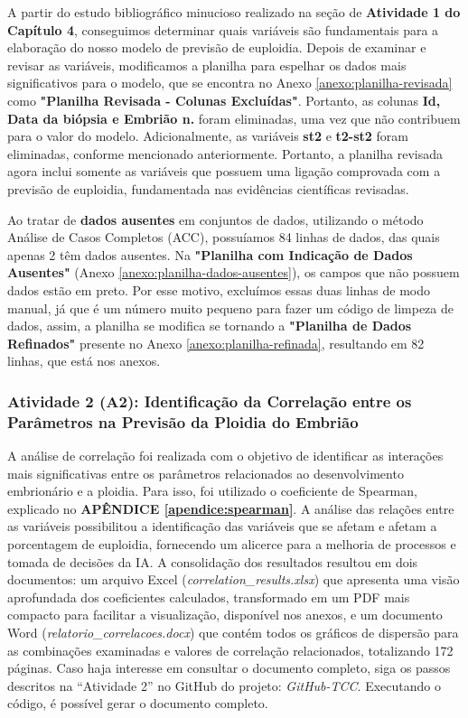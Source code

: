A partir do estudo bibliográfico minucioso realizado na seção de \textbf{Atividade 1 do Capítulo 4}, conseguimos determinar quais variáveis são fundamentais para a elaboração do nosso modelo de previsão de euploidia. Depois de examinar e revisar as variáveis, modificamos a planilha para espelhar os dados mais significativos para o modelo, que se encontra no Anexo \ref{anexo:planilha-revisada} como \textbf{"Planilha Revisada - Colunas Excluídas"}. Portanto, as colunas \textbf{Id, Data da biópsia e Embrião n.} foram eliminadas, uma vez que não contribuem para o valor do modelo. Adicionalmente, as variáveis \textbf{st2} e \textbf{t2-st2} foram eliminadas, conforme mencionado anteriormente. Portanto, a planilha revisada agora inclui somente as variáveis que possuem uma ligação comprovada com a previsão de euploidia, fundamentada nas evidências científicas revisadas.

Ao tratar de \textbf{dados ausentes} em conjuntos de dados, utilizando o método Análise de Casos Completos (ACC), possuíamos 84 linhas de dados, das quais apenas 2 têm dados ausentes. Na \textbf{"Planilha com Indicação de Dados Ausentes"} (Anexo \ref{anexo:planilha-dados-ausentes}), os campos que não possuem dados estão em preto. Por esse motivo, excluímos essas duas linhas de modo manual, já que é um número muito pequeno para fazer um código de limpeza de dados, assim, a planilha se modifica se tornando a \textbf{"Planilha de Dados Refinados"} presente no Anexo \ref{anexo:planilha-refinada}, resultando em 82 linhas, que está nos anexos. 

\subsubsection{Atividade 2 (A2): Identificação da Correlação entre os Parâmetros na Previsão da Ploidia do Embrião}

A análise de correlação foi realizada com o objetivo de identificar as interações mais significativas entre os parâmetros relacionados ao desenvolvimento embrionário e a ploidia. Para isso, foi utilizado o coeficiente de Spearman, explicado no \textbf{APÊNDICE \ref{apendice:spearman}}. A análise das relações entre as variáveis possibilitou a identificação das variáveis que se afetam e afetam a porcentagem de euploidia, fornecendo um alicerce para a melhoria de processos e tomada de decisões da IA. A consolidação dos resultados resultou em dois documentos: um arquivo Excel (\textit{correlation\_results.xlsx}) que apresenta uma visão aprofundada dos coeficientes calculados, transformado em um PDF mais compacto para facilitar a visualização, disponível nos anexos, e um documento Word (\textit{relatorio\_correlacoes.docx}) que contém todos os gráficos de dispersão para as combinações examinadas e valores de correlação relacionados, totalizando 172 páginas. Caso haja interesse em consultar o documento completo, siga os passos descritos na “Atividade 2” no GitHub do projeto: \textit{GitHub-TCC}. Executando o código, é possível gerar o documento completo.

